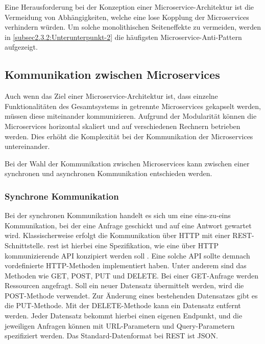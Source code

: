 Eine Herausforderung bei der Konzeption einer Microservice-Architektur ist die Vermeidung von Abhängigkeiten, welche eine lose Kopplung der Microservices verhindern würden. Um solche monolithischen Seiteneffekte zu vermeiden, werden in \autoref{subsec2.3.2:Unterunterpunkt-2} die häufigsten Microservice-Anti-Pattern aufgezeigt.

\subsection{Kommunikation zwischen Microservices\label{subsec2.3.1:Unterunterpunkt-1}}

Auch wenn das Ziel einer Microservice-Architektur ist, dass einzelne Funktionalitäten des Gesamtsystems in getrennte Microservices gekapselt werden, müssen diese miteinander kommunizieren. Aufgrund der Modularität können die Microservices horizontal skaliert und auf verschiedenen Rechnern betrieben werden. Dies erhöht die Komplexität bei der Kommunikation der Microservices untereinander. \cite{MichaelSchwab.2019}

Bei der Wahl der Kommunikation zwischen Microservices kann zwischen einer synchronen und asynchronen Kommunikation entschieden werden.

\subsubsection*{Synchrone Kommunikation}

Bei der synchronen Kommunikation handelt es sich um eine eins-zu-eins Kommunikation, bei der eine Anfrage geschickt und auf eine Antwort gewartet wird. Klassischerweise erfolgt die Kommunikation über HTTP mit einer REST-Schnittstelle. \gls{rest} ist hierbei eine Spezifikation, wie eine über HTTP kommunizierende API konzipiert werden soll \cite{MichaelSchwab.2019}. Eine solche API sollte demnach vordefinierte HTTP-Methoden implementiert haben. Unter anderem sind das Methoden wie GET, POST, PUT und DELETE. Bei einer GET-Anfrage werden Ressourcen angefragt. Soll ein neuer Datensatz übermittelt werden, wird die POST-Methode verwendet. Zur Änderung eines bestehenden Datensatzes gibt es die PUT-Methode. Mit der DELETE-Methode kann ein Datensatz entfernt werden. Jeder Datensatz bekommt hierbei einen eigenen Endpunkt, und die jeweiligen Anfragen können mit URL-Parametern und Query-Parametern spezifiziert werden. Das Standard-Datenformat bei REST ist JSON.

